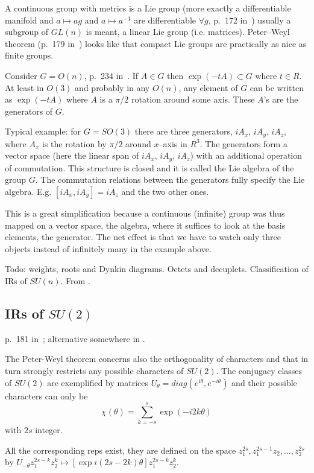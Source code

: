 A continuous group with metrics is a Lie group (more exactly a differentiable
manifold and $a\mapsto ag$ and $a\mapsto a^{-1}$ are differentiable $\forall
g$, p.~172 in~\cite{sternberg}) usually a subgroup of $GL(n)$ is meant, a
linear Lie group (i.e. matrices). Peter--Weyl theorem (p.~179
in~\cite{sternberg}) looks like that compact Lie groups are practically as
nice as finite groups.

Consider $G=O(n)$, p.~234 in~\cite{sternberg}. If $A\in G$ then
$\exp(-tA)\subset G$ where $t\in R$. At least in $O(3)$ and probably in any
$O(n)$, any element of $G$ can be written as $\exp(-tA)$ where $A$ is a
$\pi/2$ rotation around some axis. These $A$'s are the generators of $G$.

Typical example: for
$G=SO(3)$ there are three generators, $iA_x$, $iA_y$, $iA_z$, where $A_x$ is
the rotation by $\pi/2$ around $x$--axis in $R^3$. The generators form a
vector space (here the linear span of $iA_x$, $iA_y$, $iA_z$) with an
additional operation of commutation. This structure is closed and it is called
the Lie algebra of the group $G$. The commutation relations between the
generators fully specify the Lie algebra. E.g. $[iA_x,iA_y]=iA_z$
and the two other ones.

This is a great simplification because a continuous (infinite) group was thus
mapped on a vector space, the algebra, where it suffices to look at the basis
elements, the generator. The net effect is that we have to watch only three
objects instead of infinitely many in the example above.

Todo: weights, roots and Dynkin diagrams. Octets and decuplets. Classification
of IRs of $SU(n)$. From \cite{georgi}.


\subsection{IRs of $SU(2)$}

p.~181 in~\cite{sternberg}; alternative somewhere in \cite{georgi}.

The Peter-Weyl theorem concerns also the orthogonality of characters and that
in turn strongly restricts any possible characters of $SU(2)$. The conjugacy
classes of $SU(2)$ are exemplified by matrices
$U_\theta=diag(e^{i\theta},e^{-i\theta})$ and their possible characters can
only be
%
$$\chi(\theta)=\sum_{k=-s}^{s} \exp(-i2k\theta)$$
%
with $2s$ integer.

All the corresponding reps exist, they are defined on the space
$z_1^{2s},z_1^{2s-1}z_2,\ldots, z_2^{2s}$ by
$U_{-\theta}z_1^{2s-k}z_2^k\mapsto [\exp i(2s-2k)\theta]z_1^{2s-k}z_2^k$.
 
